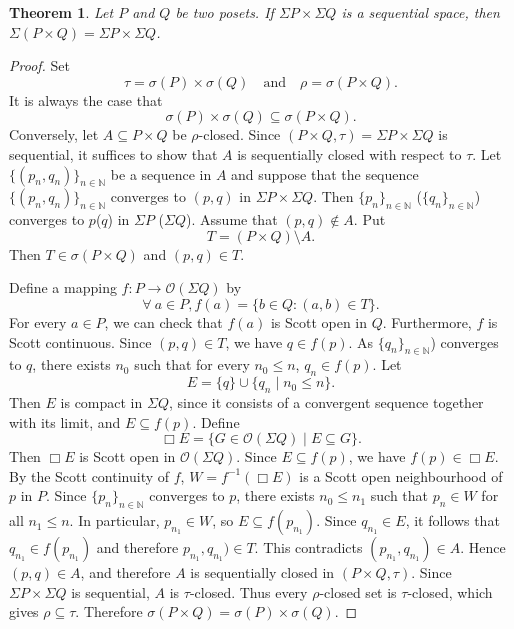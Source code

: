 \documentclass[10pt,a4paper]{amsart}
\newtheorem{theorem}{Theorem}
\begin{document}
\begin{theorem} {\rm Let $P$ and $Q$ be two posets. If $\Sigma P\times \Sigma Q$ is a sequential  space, then $\Sigma (P\times Q)=\Sigma P \times \Sigma Q$.}
\end{theorem}

\begin{proof}
Set $$\tau=\sigma(P)\times\sigma(Q)
    \quad\text{and}\quad
    \rho=\sigma(P\times Q).$$
It is always the case that $$\sigma(P)\times\sigma(Q)\subseteq\sigma(P\times Q).$$
Conversely, let $A\subseteq P\times Q$ be
$\rho$-closed. Since $(P\times Q,\tau)=\Sigma P\times\Sigma Q$
is sequential, it suffices to show that $A$ is sequentially closed
with respect to $\tau$. Let $\{(p_n,q_n)\}_{n\in\mathbb{N}}$ be a sequence in $A$ and suppose that
the sequence $\{(p_n,q_n)\}_{n\in\mathbb{N}}$ converges to $(p,q)$ in $\Sigma P\times\Sigma Q$. Then $\{p_n\}_{n\in\mathbb{N}}$ ($\{q_{n}\}_{n\in\mathbb{N}}$) converges to $p$($q$) in $\Sigma P$ ($\Sigma Q$). Assume that $(p,q)\notin A$. Put $$T=(P\times Q)\setminus A.$$ Then $T\in\sigma(P\times Q)$ and $(p,q)\in T$.

Define a mapping $f:P\longrightarrow\mathcal O(\Sigma Q)$ by
 $$ \forall\ a\in P, f(a)=\{b\in Q:(a,b)\in T\}.$$
For every $a\in P$, we can check that $f(a)$ is Scott open in $Q$. Furthermore,
$f$ is Scott continuous. Since $(p,q)\in T$, we have $q\in f(p)$. As
$\{q_{n}\}_{n\in\mathbb{N}}$) converges to $q$, there exists $n_{0}$ such
that for every $n_0\leq n$, $q_n\in f(p)$. Let
$$E=\{q\}\cup\{q_n\mid n_0\leq n\}.$$
Then $E$ is compact in $\Sigma Q$, since it consists of a
convergent sequence together with its limit, and $E\subseteq f(p)$. Define
$$\Box E=\{G\in\mathcal O(\Sigma Q)\mid E\subseteq G\}.$$
Then $\Box E$ is Scott open in $\mathcal O(\Sigma Q)$. Since $E\subseteq f(p)$, we have $f(p)\in\Box E$. By the Scott
continuity of $f$, $W=f^{-1}(\Box E)$
is a Scott open neighbourhood of $p$ in $P$. Since $\{p_n\}_{n\in\mathbb{N}}$ converges to $p$,
there exists $n_0\leq n_1$ such that $p_{n}\in W$ for all $n_1\leq n$. In particular, $p_{n_1}\in W$, so $E\subseteq f(p_{n_1})$. Since $q_{n_1}\in E$, it follows that $q_{n_1}\in f(p_{n_1})$ and therefore $p_{n_1},q_{n_1})\in T$. This contradicts $(p_{n_1},q_{n_1})\in A$. Hence $(p,q)\in A$, and therefore $A$ is sequentially closed in
$(P\times Q,\tau)$. Since $\Sigma P\times \Sigma Q$  is sequential, $A$ is
$\tau$-closed. Thus every $\rho$-closed set is $\tau$-closed,
which gives $\rho\subseteq\tau$. Therefore
$\sigma(P\times Q)=\sigma(P)\times\sigma(Q)$. \end{proof}
\end{document}
